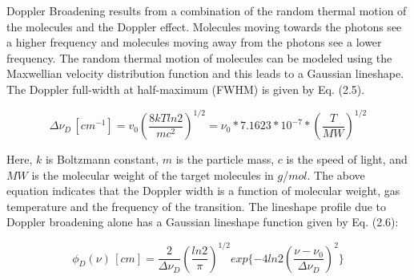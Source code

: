 
Doppler Broadening results from a combination of the random thermal motion of the molecules and the Doppler effect. Molecules moving towards the photons see a higher frequency and molecules moving away from the photons see a lower frequency. The random thermal motion of molecules can be modeled using the Maxwellian velocity distribution function and this leads to a Gaussian lineshape. The Doppler full-width at half-maximum (FWHM) is given by Eq. (2.5).

\begin{equation}\label{}
\Delta\nu_D \,[cm^{-1}]=v_0(\frac{8kTln2}{mc^2})^{1/2}=\nu_{0}*7.1623*10^{-7}*(\frac{T}{MW})^{1/2}
\end{equation}

\vspace{3mm}

\noindent Here, $k$ is Boltzmann constant, $m$ is the particle mass, $c$ is the speed of light, and $MW$ is the molecular weight of the  target molecules in $g$/$mol$. The above equation indicates that the Doppler width is a function of molecular weight, gas temperature and the frequency of the transition. The lineshape profile due to Doppler broadening alone has a Gaussian lineshape function given by Eq. (2.6):

\begin{equation}\label{}
\phi_D(\nu) \,[cm]=\frac{2}{\Delta\nu_D}(\frac{ln2}{\pi})^{1/2}exp\{-4ln2(\frac{\nu-\nu_0}{\Delta\nu_D})^2\}
\end{equation}

